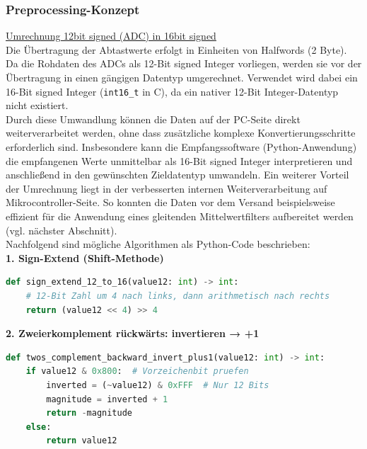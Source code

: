 \documentclass[a4paper, portrait, 12pt]{scrartcl} %
\begin{document}
\subsubsection{Preprocessing-Konzept}
\label{subsubsec:preprocessing_concept}

\underline{Umrechnung 12bit signed (ADC) in 16bit signed}\\
Die Übertragung der Abtastwerte erfolgt in Einheiten von Halfwords (2 Byte). Da die Rohdaten des ADCs als 12-Bit signed Integer vorliegen, werden sie vor der Übertragung in einen gängigen Datentyp umgerechnet. Verwendet wird dabei ein 16-Bit signed Integer (\texttt{int16\_t} in C), da ein nativer 12-Bit Integer-Datentyp nicht existiert.\\
Durch diese Umwandlung können die Daten auf der PC-Seite direkt weiterverarbeitet werden, ohne dass zusätzliche komplexe Konvertierungsschritte erforderlich sind. Insbesondere kann die Empfangssoftware (Python-Anwendung) die empfangenen Werte unmittelbar als 16-Bit signed Integer interpretieren und anschließend in den gewünschten Zieldatentyp umwandeln. Ein weiterer Vorteil der Umrechnung liegt in der verbesserten internen Weiterverarbeitung auf Mikrocontroller-Seite. So konnten die Daten vor dem Versand beispielsweise effizient für die Anwendung eines gleitenden Mittelwertfilters aufbereitet werden (vgl. nächster Abschnitt).\\

Nachfolgend sind mögliche Algorithmen als Python-Code beschrieben:\\

\textbf{1. Sign-Extend (Shift-Methode)}
\begin{lstlisting}[language=Python, caption=Sign-extend (Arithmetisches Shift schiebt das MSB nach)]
def sign_extend_12_to_16(value12: int) -> int:
    # 12-Bit Zahl um 4 nach links, dann arithmetisch nach rechts
    return (value12 << 4) >> 4
\end{lstlisting}

\textbf{2. Zweierkomplement rückwärts: invertieren → +1}
\begin{lstlisting}[language=Python, caption=Zweierkomplement rückwärts aufgelöst.]
def twos_complement_backward_invert_plus1(value12: int) -> int:
	if value12 & 0x800:  # Vorzeichenbit pruefen
		inverted = (~value12) & 0xFFF  # Nur 12 Bits
		magnitude = inverted + 1
		return -magnitude
	else:
		return value12
\end{lstlisting}

\pagebreak
\end{document}
